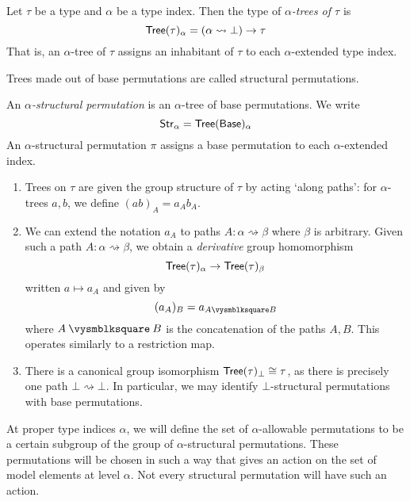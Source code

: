 \begin{definition}
    Let \( \tau \) be a type and \( \alpha \) be a type index.
    Then the type of \emph{\( \alpha \)-trees of \( \tau \)} is
    \[ \mathsf{Tree}(\tau)_\alpha = (\alpha \rightsquigarrow \bot) \to \tau \]
    That is, an \( \alpha \)-tree of \( \tau \) assigns an inhabitant of \( \tau \) to each \( \alpha \)-extended type index.
\end{definition}
Trees made out of base permutations are called structural permutations.
\begin{definition}
    An \emph{\( \alpha \)-structural permutation} is an \( \alpha \)-tree of base permutations.
    We write
    \[ \mathsf{Str}_\alpha = \mathsf{Tree}(\mathsf{Base})_\alpha \]
    An \( \alpha \)-structural permutation \( \pi \) assigns a base permutation to each \( \alpha \)-extended index.
\end{definition}
\begin{remarks}\mbox\negthinspace
    \begin{enumerate}
        \item {} Trees on \( \tau \) are given the group structure of \( \tau \) by acting `along paths': for \( \alpha \)-trees \( a, b \), we define \( (ab)_A = a_A b_A \).
        \item {} We can extend the notation \( a_A \) to paths \( A : \alpha \rightsquigarrow \beta \) where \( \beta \) is arbitrary.
        Given such a path \( A : \alpha \rightsquigarrow \beta \), we obtain a \emph{derivative} group homomorphism
        \[ \mathsf{Tree}(\tau)_\alpha \to \mathsf{Tree}(\tau)_\beta \]
        written \( a \mapsto a_A \) and given by
        \[ (a_A)_B = a_{A \pcomp B} \]
        where \( A \pcomp B \) is the concatenation of the paths \( A, B \).
        This operates similarly to a restriction map.
        \item {} There is a canonical group isomorphism \( \mathsf{Tree}(\tau)_\bot \cong \tau \), as there is precisely one path \( \bot \rightsquigarrow \bot \).
        In particular, we may identify \( \bot \)-structural permutations with base permutations.
    \end{enumerate}
\end{remarks}

At proper type indices \( \alpha \), we will define the set of \( \alpha \)-allowable permutations to be a certain subgroup of the group of \( \alpha \)-structural permutations.
These permutations will be chosen in such a way that gives an action on the set of model elements at level \( \alpha \).
Not every structural permutation will have such an action.

